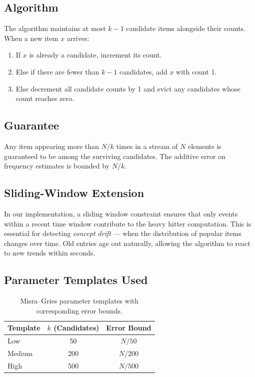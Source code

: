 \subsection{Algorithm}
The algorithm maintains at most $k-1$ candidate items alongside their counts. When a new item $x$ arrives:
\begin{enumerate}
    \item If $x$ is already a candidate, increment its count.
    \item Else if there are fewer than $k-1$ candidates, add $x$ with count 1.
    \item Else decrement all candidate counts by 1 and evict any candidates whose count reaches zero.
\end{enumerate}

\subsection{Guarantee}
Any item appearing more than $N/k$ times in a stream of $N$ elements is guaranteed to be among the surviving candidates. The additive error on frequency estimates is bounded by $N/k$.

\subsection{Sliding-Window Extension}
In our implementation, a sliding window constraint ensures that only events within a recent time window contribute to the heavy hitter computation. This is essential for detecting \textit{concept drift} --- when the distribution of popular items changes over time. Old entries age out naturally, allowing the algorithm to react to new trends within seconds.

\subsection{Parameter Templates Used}
\begin{table}[htbp]
\centering
\begin{tabular}{l c c}
\toprule
\textbf{Template} & \textbf{$k$ (Candidates)} & \textbf{Error Bound} \\
\midrule
Low    & 50  & $N/50$ \\
Medium & 200 & $N/200$ \\
High   & 500 & $N/500$ \\
\bottomrule
\end{tabular}
\caption{Misra--Gries parameter templates with corresponding error bounds.}
\label{tab:mg_templates}
\end{table}
